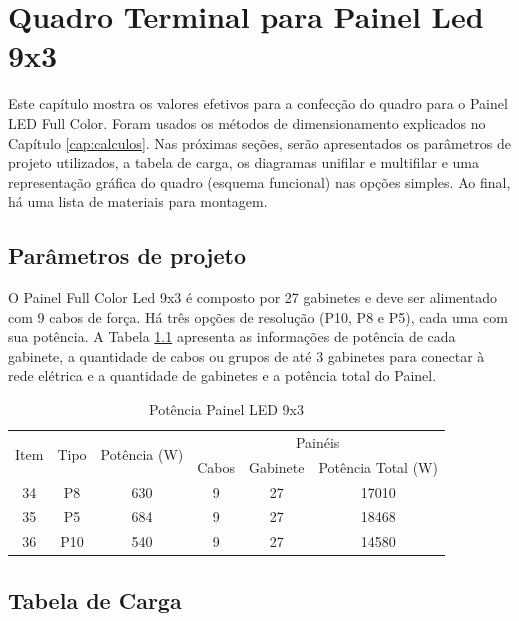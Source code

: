 \chapter{Quadro Terminal para Painel Led 9x3}
Este capítulo mostra os valores efetivos para a confecção do quadro para o Painel LED Full Color. Foram usados os métodos de dimensionamento explicados no Capítulo \ref{cap:calculos}. Nas próximas seções, serão apresentados os parâmetros de projeto utilizados, a tabela de carga, os diagramas unifilar e multifilar e uma representação gráfica do quadro (esquema funcional) nas opções simples. Ao final, há uma lista de materiais para montagem.

\section{Parâmetros de projeto}

O Painel Full Color Led 9x3 é composto por 27 gabinetes e deve ser alimentado com 9 cabos de força. Há três opções de resolução (P10, P8 e P5), cada uma com sua potência. A Tabela \ref{tab:pot_9x3} apresenta as informações de potência de cada gabinete, a quantidade de cabos ou grupos de até 3 gabinetes para conectar à rede elétrica e a quantidade de gabinetes e a potência total do Painel.

\begin{table}[htbp]
\caption{Potência Painel LED 9x3}
\centering
\begin{tabular}{cccccc}
\toprule
\multirow{2}{*}{Item} & \multirow{2}{*}{Tipo} & \multirow{2}{*}{Potência (W)} & \multicolumn{3}{c}{Painéis} \\
\cmidrule{4-6}
& & & Cabos  & Gabinete & Potência Total (W) \\
\midrule


34 & P8 & 630 & 9 & 27 & 17010 \\
35 & P5 & 684 & 9 & 27 & 18468 \\
36 & P10 & 540 & 9 & 27 & 14580 \\


\bottomrule
\end{tabular}
\label{tab:pot_9x3}
\end{table}


\section{Tabela de Carga}



